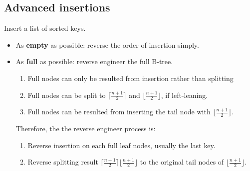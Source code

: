 \documentclass[a4paper]{report}
\begin{document}
\subsection{Advanced insertions}
Insert a list of sorted keys. 
\begin{itemize}
\item As \textbf{empty} as possible: reverse the order of insertion simply.
\item As \textbf{full} as possible:
reverse engineer the full B-tree. 
\begin{enumerate}
\item Full nodes can only be resulted from insertion rather than splitting
\item Full nodes can be split to $\lceil\frac{n+1}{2}\rceil$ and $\lfloor\frac{n+1}{2}\rfloor$, if left-leaning. 
\item Full nodes can be resulted from inserting the tail node with $\lfloor\frac{n+1}{2}\rfloor$.
\end{enumerate}
Therefore, the the reverse engineer process is:
\begin{enumerate}
\item Reverse insertion on each full leaf nodes, usually the last key. 
\item Reverse splitting result $\lceil\frac{n+1}{2}\rceil$$\lfloor\frac{n+1}{2}\rfloor$ to the original tail nodes of $\lfloor\frac{n+1}{2}\rfloor$. 
\end{enumerate}
\end{itemize}
\end{document}
